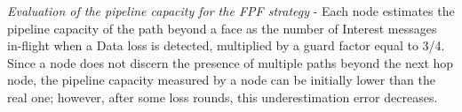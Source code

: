 \documentclass{sig-alternate-10pt}
\begin{document}
\emph{Evaluation of the pipeline capacity for the FPF strategy} - Each node estimates the pipeline capacity of the path beyond a face as the number of Interest messages in-flight when a Data loss is detected, multiplied by a guard factor equal to 3/4. Since a node does not discern the presence of multiple paths beyond the next hop node, the pipeline capacity measured by a node can be initially lower than the real one; however, after some loss rounds, this underestimation error decreases.
\end{document}
